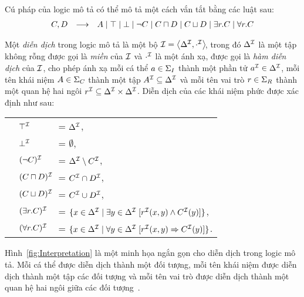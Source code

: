 \noindent
Cú pháp của logic mô tả \ALC có thể mô tả một cách vắn tắt bằng các luật sau:
\[
	\begin{array}{r c l}
		C, D & \longrightarrow&
		A \mid
		\top \mid
		\bot \mid
		\neg C \mid
		C\sqcap D \mid
		C \sqcup D \mid
		\exists r.C \mid
		\forall r.C
	\end{array}
\]

\begin{Definition}
Một {\em diễn dịch} trong logic mô tả \ALC là một bộ \mbox{$\mathcal{I} = \left\langle\Delta^{\mathcal{I}}, \cdot^{\mathcal{I}}\right\rangle\!$}, trong đó $\Delta^{\mathcal{I}}$ là một tập không rỗng được gọi là {\em miền} của $\mathcal{I}$ và $\cdot^{\mathcal{I}}$ là một ánh xạ, được gọi là {\em hàm diễn dịch} của $\mathcal{I}$, cho phép ánh xạ mỗi cá thể $a \in \Sigma_I$ thành một phần tử $a^{\mathcal{I}} \in \Delta^{\mathcal{I}}$, mỗi tên khái niệm $A \in \Sigma_C$ thành một tập $A^{\mathcal{I}} \subseteq \Delta^{\mathcal{I}}$ và mỗi tên vai trò $r \in \Sigma_R$ thành một quan hệ hai ngôi $r^{\mathcal{I}} \subseteq \Delta^{\mathcal{I}} \times \Delta^{\mathcal{I}}$.
Diễn dịch của các khái niệm phức được xác định như sau:\\[1.5ex]
\begin{tabular}{c l l}
	& $\top^{\mathcal{I}}$             & = $\Delta^{\mathcal{I}}$, \\[0.5ex]
	& $\bot^{\mathcal{I}}$             & = $\emptyset$, \\[0.5ex]
	& $(\neg C)^{\mathcal{I}}$         & = $\Delta^{\mathcal{I}} \setminus C^{\mathcal{I}}$, \\[0.5ex]
	& $(C \sqcap D)^{\mathcal{I}}\!\!\!$& = $C^{\mathcal{I}} \cap D^{\mathcal{I}}$, \\[0.5ex]
	& $(C \sqcup D)^{\mathcal{I}}\!\!\!\!\!$ & = $C^{\mathcal{I}} \cup D^{\mathcal{I}}$, \\[0.5ex]
	& $(\exists r.C)^{\mathcal{I}}$         & = $\{x \in \Delta^{\mathcal{I}} \mid \exists y\in \Delta^{\mathcal{I}}\; [r^{\mathcal{I}}(x,y) \wedge C^{\mathcal{I}}(y)]\}$, \\[0.7ex]
	& $(\forall r.C)^{\mathcal{I}}$         & = $\{ x \in \Delta^{\mathcal{I}} \mid \forall y \in \Delta^{\mathcal{I}}\; [r^{\mathcal{I}}(x,y) \Rightarrow C^{\mathcal{I}}(y)]\}$.\hspace{5.15cm}\myend
\end{tabular}
\end{Definition}

Hình~\ref{fig:Interpretation} là một minh họa ngắn gọn cho diễn dịch trong logic mô tả. Mỗi cá thể được diễn dịch thành một đối tượng, mỗi tên khái niệm được diễn dịch thành một tập các đối tượng và mỗi tên vai trò được diễn dịch thành một quan hệ hai ngôi giữa các đối tượng~\cite{Rouene2013}.

